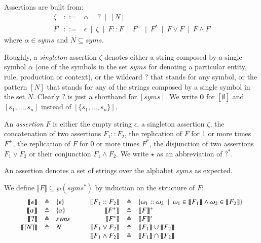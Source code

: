 \begin{definition}
\label{def:assetionl}
Assertions are built from: 
$$
\begin{array}{lcl}
\zeta & ::= & 
\alpha ~\mid ~ 
? ~\mid ~ 
[N]
\\
F & ::= & 
\epsilon ~\mid ~ 
\zeta ~\mid ~ 
F::F ~\mid ~ 
F^+ ~\mid ~ 
F^* ~\mid ~ 
F \vee F ~\mid ~ 
F \wedge F
\end{array}
$$
where $\alpha \in \mathit{syms}$ and $N\subseteq \mathit{syms}$.
\end{definition}

Roughly, a \emph{singleton} assertion $\zeta$ denotes either a string composed by a single symbol $\alpha$ (one of the symbols in the set $\mathit{syms}$ for denoting a particular entity, rule, production or context), or
the wildcard $?$ that stands for any symbol, or the pattern $[N]$ that stands for any of the strings composed by a single symbol in the set $N$. Clearly $?$  is just a shorthand for $[\mathit{syms}]$.
We write $\mathbf{0}$ for $[\emptyset]$ and $[s_1,...,s_n]$ instead of $[\{s_1,...,s_n\}]$. 

An \emph{assertion} $F$ is either the empty string $\epsilon$, a singleton assertion $\zeta$, the concatenation of two assertions $F_1::F_2$, the replication of $F$ for 1 or more times $F^+$, the replication of $F$ for 0 or more times $F^*$, the disjunction of two assertions $F_1 \vee F_2$ or their conjunction $F_1 \wedge F_2$. We write $\star$ as an abbreviation of $?^*$.

An assertion denotes a set of strings over the alphabet $\mathit{syms}$ as expected.

\begin{definition}
 We define $\llbracket F\rrbracket \subseteq\wp(\mathit{syms}^*)$ by induction on the structure of $F$: 
\[
\begin{array}{rcl@{\hspace{1cm}}rcl}
 \llbracket \epsilon \rrbracket &\defeq&  \{\epsilon\}
 & \llbracket F_1::F_2 \rrbracket &\defeq& \{\omega_1 :: \omega_2~\mid~ \omega_1 \in \llbracket F_1 \rrbracket \wedge \omega_2 \in \llbracket F_2 \rrbracket\}  \\
 \llbracket \alpha \rrbracket &\defeq&  \{\alpha\} 
 & \llbracket F^+ \rrbracket &\defeq& \llbracket F \rrbracket^+  \\
 \llbracket ? \rrbracket &\defeq&   \mathit{syms}
 & \llbracket F^* \rrbracket &\defeq& \llbracket F \rrbracket^*  \\
 \llbracket [N]\rrbracket &\defeq&   N
 & \llbracket  F_1 \vee F_2 \rrbracket &\defeq& \llbracket  F_1\rrbracket \cup \llbracket  F_2\rrbracket  \\
 &&&\llbracket  F_1 \wedge F_2 \rrbracket &\defeq& \llbracket F_1 \rrbracket \cap \llbracket F_2\rrbracket 
\end{array}
\]
\end{definition}





